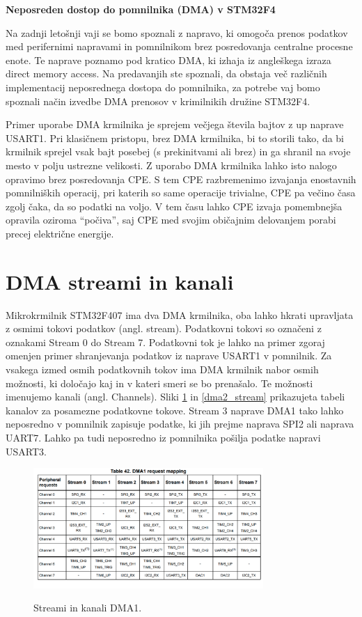 \documentclass[12pt,letterpaper]{article}
\begin{document}
\begin{center}
    \textbf{\Large Neposreden dostop do pomnilnika (DMA) v STM32F4}
\end{center}

Na zadnji letošnji vaji se bomo spoznali z napravo, ki omogoča prenos podatkov med perifernimi napravami in pomnilnikom brez posredovanja centralne procesne enote. Te naprave poznamo pod kratico DMA, ki izhaja iz angleškega izraza direct memory access. Na predavanjih ste spoznali, da obstaja več različnih implementacij neposrednega dostopa do pomnilnika, za potrebe vaj bomo spoznali način izvedbe DMA prenosov v krimilnikih družine STM32F4.

Primer uporabe DMA krmilnika je sprejem večjega števila bajtov z up naprave USART1. Pri klasičnem pristopu, brez DMA krmilnika, bi to storili tako, da bi krmilnik sprejel vsak bajt posebej (s prekinitvami ali brez) in ga shranil na svoje mesto v polju ustrezne velikosti. Z uporabo DMA krmilnika lahko isto nalogo opravimo brez posredovanja CPE. S tem CPE razbremenimo izvajanja enostavnih pomnilniških operacij, pri katerih so same operacije trivialne, CPE pa večino časa zgolj čaka, da so podatki na voljo. V tem času lahko CPE izvaja pomembnejša opravila oziroma ``počiva'', saj CPE med svojim običajnim delovanjem porabi precej električne energije.


\section*{DMA streami in kanali}

Mikrokrmilnik STM32F407 ima dva DMA krmilnika, oba lahko hkrati upravljata z osmimi tokovi podatkov (angl. stream). Podatkovni tokovi so označeni z oznakami Stream 0 do Stream 7. Podatkovni tok je lahko na primer zgoraj omenjen primer shranjevanja podatkov iz naprave USART1 v pomnilnik. Za vsakega izmed osmih podatkovnih tokov ima DMA krmilnik nabor osmih možnosti, ki določajo kaj in v kateri smeri se bo prenašalo. Te možnosti imenujemo kanali (angl. Channels). Sliki \ref{dma1_stream} in \ref{dma2_stream} prikazujeta tabeli kanalov za posamezne podatkovne tokove. Stream 3 naprave DMA1 tako lahko neposredno v pomnilnik zapisuje podatke, ki jih prejme naprava SPI2 ali naprava UART7. Lahko pa tudi neposredno iz pomnilnika pošilja podatke napravi USART3.

\begin{figure}[ht!]
  \centering
  \caption{Streami in kanali DMA1.}
  \includegraphics[width=330px]{images/vaja9/DMA1.png}
  \label{dma1_stream}
\end{figure}
\end{document}
